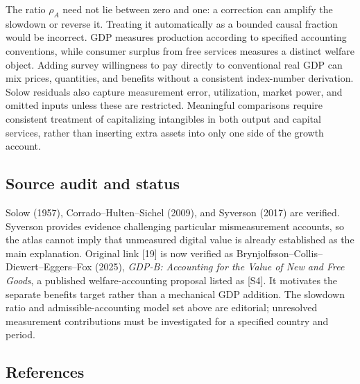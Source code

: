 \documentclass[11pt,a4paper]{article}
\begin{document}
The ratio $\rho_A$ need not lie between zero and one: a correction can amplify the slowdown or reverse it. Treating it automatically as a bounded causal fraction would be incorrect. GDP measures production according to specified accounting conventions, while consumer surplus from free services measures a distinct welfare object. Adding survey willingness to pay directly to conventional real GDP can mix prices, quantities, and benefits without a consistent index-number derivation. Solow residuals also capture measurement error, utilization, market power, and omitted inputs unless these are restricted. Meaningful comparisons require consistent treatment of capitalizing intangibles in both output and capital services, rather than inserting extra assets into only one side of the growth account.

\subsection*{Source audit and status}

Solow (1957), Corrado--Hulten--Sichel (2009), and Syverson (2017) are verified. Syverson provides evidence challenging particular mismeasurement accounts, so the atlas cannot imply that unmeasured digital value is already established as the main explanation. Original link [19] is now verified as Brynjolfsson--Collis--Diewert--Eggers--Fox (2025), \emph{GDP-B: Accounting for the Value of New and Free Goods}, a published welfare-accounting proposal listed as [S4]. It motivates the separate benefits target rather than a mechanical GDP addition. The slowdown ratio and admissible-accounting model set above are editorial; unresolved measurement contributions must be investigated for a specified country and period.

\subsection*{References}
\end{document}
